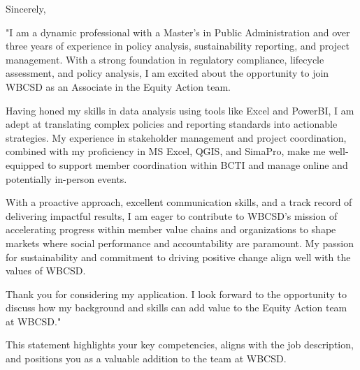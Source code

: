 \documentclass[11pt,a4paper,roman]{moderncv}
\begin{document}
\begin{minipage}[t]{\textwidth}
\end{minipage}

\opening{\vspace*{-2em}}
\closing{Sincerely,}{\vspace*{-2em}}
\makelettertitle

\justifying

"I am a dynamic professional with a Master's in Public Administration and over three years of experience in policy analysis, sustainability reporting, and project management. With a strong foundation in regulatory compliance, lifecycle assessment, and policy analysis, I am excited about the opportunity to join WBCSD as an Associate in the Equity Action team.

Having honed my skills in data analysis using tools like Excel and PowerBI, I am adept at translating complex policies and reporting standards into actionable strategies. My experience in stakeholder management and project coordination, combined with my proficiency in MS Excel, QGIS, and SimaPro, make me well-equipped to support member coordination within BCTI and manage online and potentially in-person events.

With a proactive approach, excellent communication skills, and a track record of delivering impactful results, I am eager to contribute to WBCSD's mission of accelerating progress within member value chains and organizations to shape markets where social performance and accountability are paramount. My passion for sustainability and commitment to driving positive change align well with the values of WBCSD.

Thank you for considering my application. I look forward to the opportunity to discuss how my background and skills can add value to the Equity Action team at WBCSD."

This statement highlights your key competencies, aligns with the job description, and positions you as a valuable addition to the team at WBCSD.

\vspace{0.5cm}

\makeletterclosing
\end{document}
